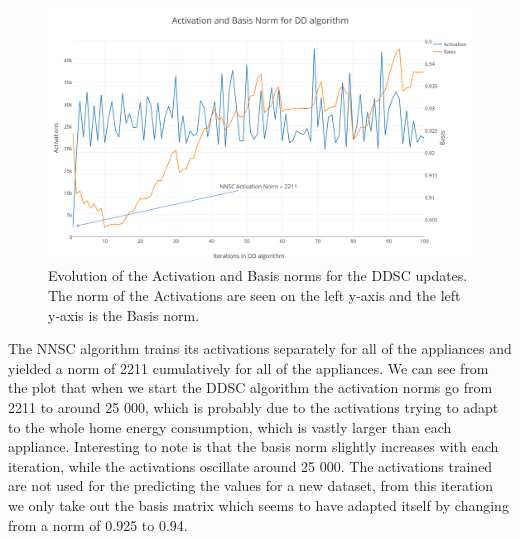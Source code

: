 \begin{figure}[H]

	\centering
	\includegraphics[scale=0.45]{./figures/a_b_norm}
	\caption{Evolution of the Activation and Basis norms for the DDSC updates. The norm of the Activations are seen on the left y-axis and the left y-axis is the Basis norm.}
	\label{fig:a_b_ddsc}
\end{figure}

The NNSC algorithm trains its activations separately for all of the appliances and yielded a norm of 2211 cumulatively for all of the appliances. We can see from the plot that when we start the DDSC algorithm the activation norms go from 2211 to around 25 000, which is probably due to the activations trying to adapt to the whole home energy consumption, which is vastly larger than each appliance. Interesting to note is that the basis norm slightly increases with each iteration, while the activations oscillate around 25 000. The activations trained are not used for the predicting the values for a new dataset, from this iteration we only take out the basis matrix which seems to have adapted itself by changing from a norm of 0.925 to 0.94.
